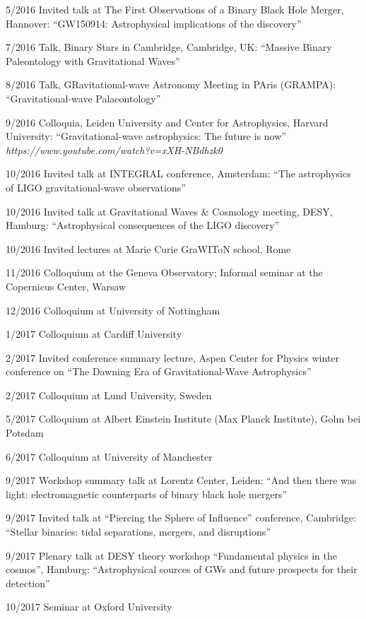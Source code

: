 \documentclass[margin,line]{res}
\begin{document}
\begin{resume}
5/2016 	Invited talk at The First Observations of a Binary Black Hole Merger, Hannover: ``GW150914: Astrophysical implications of the discovery''

7/2016	Talk, Binary Stars in Cambridge, Cambridge, UK: ``Massive Binary Paleontology with Gravitational Waves''

8/2016 	Talk, GRavitational-wave Astronomy Meeting in PAris (GRAMPA): ``Gravitational-wave Palaeontology''

9/2016 	Colloquia, Leiden University and Center for Astrophysics, Harvard University: ``Gravitational-wave astrophysics: The future is now'' {\it https://www.youtube.com/watch?v=xXH-NBdhzk0}

10/2016 	Invited talk at INTEGRAL conference, Amsterdam: ``The astrophysics of LIGO gravitational-wave observations''

10/2016 	Invited talk at Gravitational Waves \& Cosmology meeting, DESY, Hamburg:  ``Astrophysical consequences of the LIGO discovery''

10/2016 	Invited lectures at Marie Curie GraWIToN school, Rome

11/2016 	Colloquium at the Geneva Observatory; Informal seminar at the Copernicus Center, Warsaw 

12/2016 	Colloquium at University of Nottingham

1/2017 	Colloquium at Cardiff University

2/2017	Invited conference summary lecture, Aspen Center for Physics winter conference on ``The Dawning Era of Gravitational-Wave Astrophysics''

2/2017	Colloquium at Lund University, Sweden 

5/2017	Colloquium at Albert Einstein Institute (Max Planck Institute), Golm bei Potsdam

6/2017 	Colloquium at University of Manchester

9/2017	Workshop summary talk at Lorentz Center, Leiden: ``And then there was light: electromagnetic counterparts of binary black hole mergers''

9/2017	Invited talk at ``Piercing the Sphere of Influence'' conference, Cambridge: ``Stellar binaries: tidal separations, mergers, and disruptions''

9/2017	Plenary talk at DESY theory workshop ``Fundamental physics in the cosmos'', Hamburg: ``Astrophysical sources of GWs and future prospects for their detection''

10/2017	Seminar at Oxford University


\end{resume}
\end{document}
